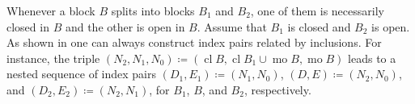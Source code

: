 \documentclass[letterpaper,11pt]{article}
\theoremstyle{plain}
\theoremstyle{definition}
\newcommand{\cl}{\operatorname{cl}}
\newcounter{li}
\DeclareMathOperator{\mo}{mo}
\begin{document}

Whenever a block $B$ splits into blocks $B_1$ and $B_2$, 
    one of them is necessarily closed in $B$ and the other is open in $B$.
Assume that $B_1$ is closed and $B_2$ is open.
As shown in \cite[Section~5.4]{CMbarcodes2025} one can always construct index pairs related by inclusions.
For instance, the triple $(N_2,N_1,N_0)\coloneqq(\cl B, \cl B_1\cup \mo B, \mo B)$ leads to a nested sequence of index pairs
    $(D_1, E_1)\coloneqq(N_1, N_0)$, 
    $(D, E)\coloneqq(N_2, N_0)$, 
    and 
    $(D_2, E_2)\coloneqq(N_2, N_1)$, for 
        $B_1$, $B$, and $B_2$, respectively.

\end{document}
